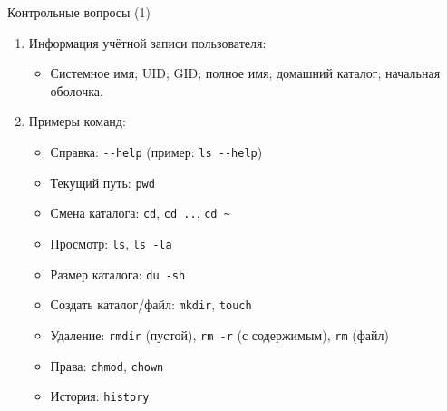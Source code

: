 \documentclass[
  ignorenonframetext,
  aspectratio=169,
  russian,
  aspectratio=169]{beamer}
\providecommand{\tightlist}{%
  \setlength{\itemsep}{0pt}\setlength{\parskip}{0pt}}
\begin{document}
\begin{frame}[fragile]{Контрольные вопросы (1)}
\label{ux43aux43eux43dux442ux440ux43eux43bux44cux43dux44bux435-ux432ux43eux43fux440ux43eux441ux44b-1}
\begin{enumerate}[<+->]
\item
  Информация учётной записи пользователя:

  \begin{itemize}[<+->]
  \tightlist
  \item
    Системное имя; UID; GID; полное имя; домашний каталог; начальная
    оболочка.
  \end{itemize}
\item
  Примеры команд:

  \begin{itemize}[<+->]
  \tightlist
  \item
    Справка: \texttt{-\/-help} (пример: \texttt{ls\ -\/-help})
  \item
    Текущий путь: \texttt{pwd}
  \item
    Смена каталога: \texttt{cd}, \texttt{cd\ ..},
    \texttt{cd\ \textasciitilde{}}
  \item
    Просмотр: \texttt{ls}, \texttt{ls\ -la}
  \item
    Размер каталога: \texttt{du\ -sh}
  \item
    Создать каталог/файл: \texttt{mkdir}, \texttt{touch}
  \item
    Удаление: \texttt{rmdir} (пустой), \texttt{rm\ -r} (с содержимым),
    \texttt{rm} (файл)
  \item
    Права: \texttt{chmod}, \texttt{chown}
  \item
    История: \texttt{history}
  \end{itemize}
\end{enumerate}
\end{frame}
\end{document}
